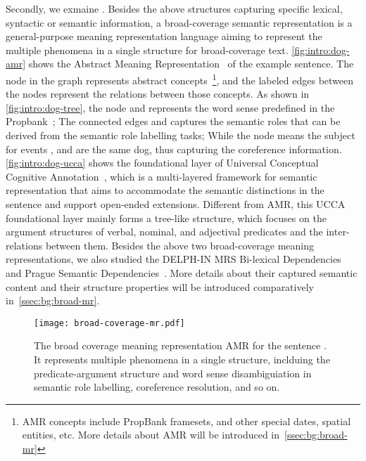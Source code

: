 Secondly, we exmaine . Besides the above structures capturing specific
lexical, syntactic or semantic information, a broad-coverage semantic
representation is a general-purpose meaning representation language
aiming to represent the multiple phenomena in a single structure for
broad-coverage text. \autoref{fig:intro:dog-amr} shows the Abstract
Meaning Representation~\citep[,][]{Ban:Bon:Cai:13} of the
example sentence. The node in the graph represents abstract
concepts~\footnote{AMR concepts include PropBank framesets, and other
  special dates, spatial entities, etc. More details about AMR will be
  introduced in~\autoref{ssec:bg:broad-mr}}, and the labeled edges
between the nodes represent the relations between those concepts. As
shown in \autoref{fig:intro:dog-tree}, the node  and
 represents the word sense predefined in the
Propbank~\cite{Kin:Pal:02}; The connected edges  and
 captures the semantic roles that can be derived from
the semantic role labelling tasks; While the node 
means the subject for events ,  and
 are the same dog, thus capturing the coreference
information. \autoref{fig:intro:dog-ucca} shows the foundational layer
of Universal Conceptual Cognitive
Annotation~\citep[,][]{Abe:Rap:13b}, which is a
multi-layered framework for semantic representation that aims to
accommodate the semantic distinctions in the sentence and support
open-ended extensions. Different from AMR, this UCCA foundational
layer mainly forms a tree-like structure, which focuses on the
argument structures of verbal, nominal, and adjectival predicates and
the inter-relations between them. Besides the above two broad-coverage
meaning representations, we also studied the DELPH-IN MRS Bi-lexical
Dependencies~\citep[,][]{ivanova2012did} and Prague Semantic
Dependencies~\citep[,][]{hajic2012announcing,miyao2014house}. More
details about their captured semantic content and their structure
properties will be introduced comparatively
in~\autoref{ssec:bg:broad-mr}.

\begin{figure}[!tbp]
\centering
\texttt{[image: broad-coverage-mr.pdf]}
\caption{\label{fig:intro:dog-amr} The broad coverage meaning
  representation AMR for the sentence \emph{}. It represents multiple
  phenomena in a single structure, inclduing the predicate-argument
  structure and word sense disambiguiation in semantic role labelling,
  coreference resolution, and so on.}
\end{figure}


